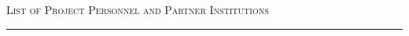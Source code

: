 



\begin{center}
{\LARGE
\textsc{List of Project Personnel and Partner Institutions}
}
\end{center}
\hrule

\vspace{3mm}


